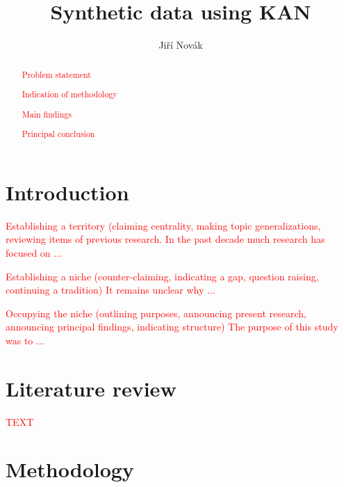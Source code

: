 \documentclass{article}
\title{Synthetic data using KAN 
}
\author{Jiří Novák
        }
\begin{document}
\maketitle

\begin{abstract}
\textcolor{red}{Problem statement} 

\textcolor{red}{Indication of methodology} 

\textcolor{red}{Main findings} 

\textcolor{red}{Principal conclusion} 
\end{abstract}

\section{Introduction}

\textcolor{red}{Establishing a territory (claiming centrality, making topic generalizations, reviewing items of previous research.} 
\textcolor{red}{In the past decade much research has focused on ...} 

\textcolor{red}{Establishing a niche (counter-claiming, indicating a gap, question raising, continuing a tradition)} 
\textcolor{red}{It remains unclear why ...} 

\textcolor{red}{Occupying the niche (outlining purposes, announcing present research, announcing principal findings, indicating structure)} 
\textcolor{red}{The purpose of this study was to ...} 

\section{Literature review}

\textcolor{red}{TEXT} 

\section{Methodology}
\end{document}
